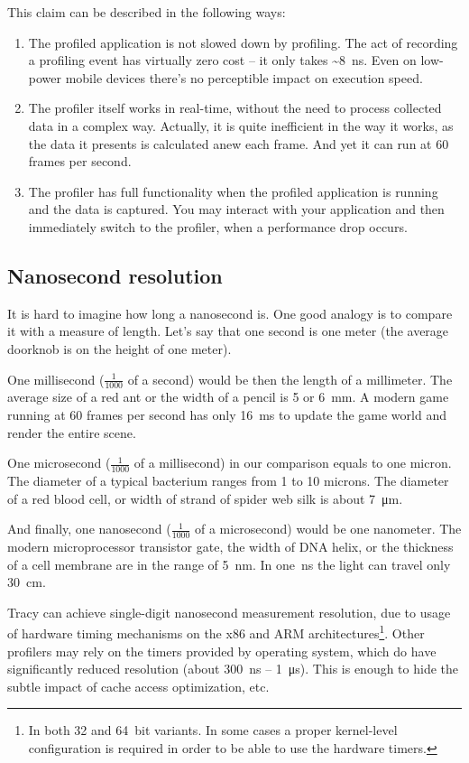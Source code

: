 \documentclass[hidelinks,titlepage,a4paper]{article}
\begin{document}
This claim can be described in the following ways:

\begin{enumerate}
\item The profiled application is not slowed down by profiling. The act of recording a profiling event has virtually zero cost -- it only takes \textasciitilde 8~\si{\nano\second}. Even on low-power mobile devices there's no perceptible impact on execution speed.
\item The profiler itself works in real-time, without the need to process collected data in a complex way. Actually, it is quite inefficient in the way it works, as the data it presents is calculated anew each frame. And yet it can run at 60 frames per second.
\item The profiler has full functionality when the profiled application is running and the data is captured. You may interact with your application and then immediately switch to the profiler, when a performance drop occurs.
\end{enumerate}

\subsection{Nanosecond resolution}

It is hard to imagine how long a nanosecond is. One good analogy is to compare it with a measure of length. Let's say that one second is one meter (the average doorknob is on the height of one meter).

One millisecond ($\frac{1}{1000}$ of a second) would be then the length of a millimeter. The average size of a red ant or the width of a pencil is 5 or 6~\si{\milli\metre}. A modern game running at 60 frames per second has only 16~\si{\milli\second} to update the game world and render the entire scene.

One microsecond ($\frac{1}{1000}$ of a millisecond) in our comparison equals to one micron. The diameter of a typical bacterium ranges from 1 to 10 microns. The diameter of a red blood cell, or width of strand of spider web silk is about 7~\si{\micro\metre}.

And finally, one nanosecond ($\frac{1}{1000}$ of a microsecond) would be one nanometer. The modern microprocessor transistor gate, the width of DNA helix, or the thickness of a cell membrane are in the range of 5~\si{\nano\metre}. In one~\si{\nano\second} the light can travel only 30~\si{\centi\meter}.

Tracy can achieve single-digit nanosecond measurement resolution, due to usage of hardware timing mechanisms on the x86 and ARM architectures\footnote{In both 32 and 64~bit variants. In some cases a proper kernel-level configuration is required in order to be able to use the hardware timers.}. Other profilers may rely on the timers provided by operating system, which do have significantly reduced resolution (about 300~\si{\nano\second} -- 1~\si{\micro\second}). This is enough to hide the subtle impact of cache access optimization, etc.
\end{document}
